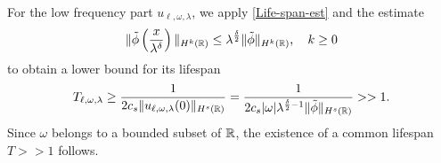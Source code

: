 %
%
For the low frequency part $u_{\ell, \omega, \lambda}$, we apply \eqref{Life-span-est} and the estimate
%
%
\begin{equation}
\begin{split}
\label{tildphi}
\|\tilde{\phi}\left( \frac{x}{\lambda^\delta}
\right)\|_{H^{k}(\mathbb{R})} \le
\lambda^{\frac{\delta}{2}}\|\tilde{\phi}\|_{H^{k}(\mathbb{R})},
\quad k\ge 0
\end{split}
\end{equation}
%
%
to obtain a lower bound for its lifespan
%
\begin{equation*}
\label{lifespan-bound-1}
\begin{split}
T_{\ell, \omega,\lambda} \ge \frac{1}{2 c_s \|u_{\ell, \omega, \lambda}(0)\|_{H^s(\mathbb{R})}} = 
\frac{1}{2 c_s |\omega|
\lambda^{\frac{\delta}{2}-1}\|\tilde{\phi}\|_{H^s(\mathbb{R})}} >> 1.
\end{split}
\end{equation*}
%
%
Since $\omega$ belongs to a bounded subset of $\mathbb{R}$, the existence of a 
common lifespan $T >> 1$ follows. 
%
%

